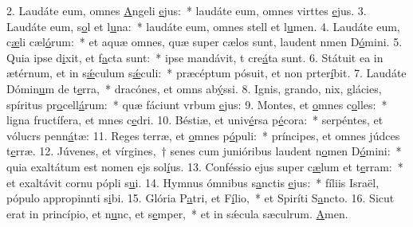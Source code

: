 2. Laudáte eum, omnes \uline{A}ngeli \uline{e}jus:~* laudáte eum, omnes virttes \uline{e}jus.
3. Laudáte eum, s\uline{o}l et l\uline{u}na:~* laudáte eum, omnes stell et l\uline{u}men.
4. Laudáte eum, c\uline{æ}li cæl\uline{ó}rum:~* et aquæ omnes, quæ super cælos sunt, laudent nmen D\uline{ó}mini.
5. Quia ipse d\uline{i}xit, et f\uline{a}cta sunt:~* ipse mandávit, t cre\uline{á}ta sunt.
6. Státuit ea in ætérnum, et in s\uline{ǽ}culum s\uline{ǽ}culi:~* præcéptum pósuit, et non prter\uline{í}bit.
7. Laudáte Dómin\uline{u}m de t\uline{e}rra,~* dracónes, et omns ab\uline{ý}ssi.
8. Ignis, grando, nix, glácies, spíritus pr\uline{o}cell\uline{á}rum:~* quæ fáciunt vrbum \uline{e}jus:
9. Montes, et \uline{o}mnes c\uline{o}lles:~* ligna fructífera, et mnes c\uline{e}dri.
10. Béstiæ, et univ\uline{é}rsa p\uline{é}cora:~* serpéntes, et vólucrs penn\uline{á}tæ:
11. Reges terræ, et \uline{o}mnes p\uline{ó}puli:~* príncipes, et omnes júdces t\uline{e}rræ.
12. Júvenes, et vírgines,~† senes cum junióribus laudent n\uline{o}men D\uline{ó}mini:~* quia exaltátum est nomen ejs sol\uline{í}us.
13. Conféssio ejus super c\uline{æ}lum et t\uline{e}rram:~* et exaltávit cornu pópli s\uline{u}i.
14. Hymnus ómnibus s\uline{a}nctis \uline{e}jus:~* fíliis Israël, pópulo appropinnti s\uline{i}bi.
15. Glória P\uline{a}tri, et F\uline{í}lio,~* et Spiríti S\uline{a}ncto.
16. Sicut erat in princípio, et n\uline{u}nc, et s\uline{e}mper,~* et in sǽcula sæculrum. \uline{A}men.
